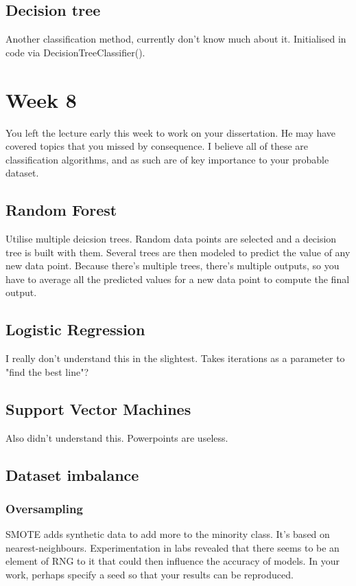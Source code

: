 \documentclass[12pt]{report}
\begin{document}
\subsection{Decision tree}
Another classification method, currently don't know much about it.
Initialised in code via DecisionTreeClassifier().

\section{Week 8}
You left the lecture early this week to work on your dissertation. He may have covered topics that you missed by
consequence. I believe all of these are classification algorithms, and as such are of key importance to your probable 
dataset.

\subsection{Random Forest}
Utilise multiple deicsion trees. Random data points are selected and a decision tree is built with them. Several
trees are then modeled to predict the value of any new data point. Because there's multiple trees, there's multiple 
outputs, so you have to average all the predicted values for a new data point to compute the final output.

\subsection{Logistic Regression}
I really don't understand this in the slightest.
Takes iterations as a parameter to "find the best line"?

\subsection{Support Vector Machines}
Also didn't understand this. Powerpoints are useless.


\subsection{Dataset imbalance}
\subsubsection{Oversampling}
SMOTE adds synthetic data to add more to the minority class. It's based on nearest-neighbours.
Experimentation in labs revealed that there seems to be an element of RNG to it that could then 
influence the accuracy of models. In your work, perhaps specify a seed so that your results 
can be reproduced.
\end{document}
